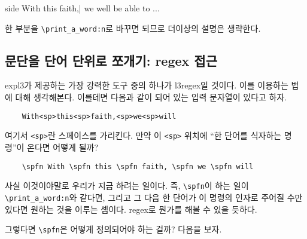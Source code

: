 \documentclass[a4paper]{oblivoir}
\def\ldots{.\kern\fontdimen3\font.\kern\fontdimen3\font.\kern\fontdimen3\font}
\begin{document}

\begin{mylistingtext}{side}
\testc With this faith,| we well be able to \ldots
\end{mylistingtext}

한 부분을 \verb|\print_a_word:n|로 바꾸면 되므로 더이상의 설명은 생략한다.

\subsection{문단을 단어 단위로 쪼개기: regex 접근}

expl3가 제공하는 가장 강력한 도구 중의 하나가 \textsf{l3regex}일 것이다. 이를 이용하는 법에 대해 생각해본다. 이를테면 다음과 같이 되어 있는 입력 문자열이 있다고 하자.
\begin{verbatim}
    With<sp>this<sp>faith,<sp>we<sp>will
\end{verbatim}
여기서 \verb|<sp>|란 스페이스를 가리킨다. 만약 이 \verb|<sp>| 위치에 ``한 단어를 식자하는 명령''이 온다면 어떻게 될까? 
\begin{verbatim}
    \spfn With \spfn this \spfn faith, \spfn we \spfn will
\end{verbatim}
사실 이것이야말로 우리가 지금 하려는 일이다. 즉, \verb|\spfn|이 하는 일이 \verb|\print_a_word:n|와 같다면, 그리고 그 다음 한 단어가 이 명령의 인자로 주어질 수만 있다면 원하는 것을 이루는 셈이다. regex로 뭔가를 해볼 수 있을 듯하다.

\bigskip

그렇다면 \verb|\spfn|은 어떻게 정의되어야 하는 걸까? 다음을 보자.
\end{document}

